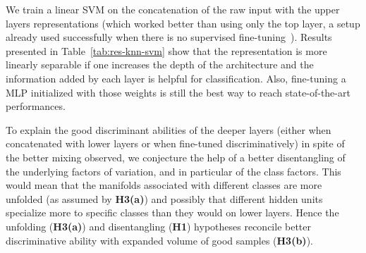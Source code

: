 We train a linear SVM on the concatenation of the raw input with the upper
layers representations (which worked better than using only the top layer,
a setup already used successfully when there is no supervised fine-tuning~\citep{HonglakLNIPS2009-small}).  
Results presented in Table~\ref{tab:res-knn-svm} show
that the representation is more linearly separable if one increases the depth of
the architecture and the information added by each layer is helpful for
classification. Also, fine-tuning a MLP initialized with those weights is still
the best way to reach state-of-the-art performances.  

To explain the good discriminant abilities of the deeper layers (either
when concatenated with lower layers or when fine-tuned discriminatively)
in spite of the better mixing observed, we conjecture the help of a
better disentangling of the underlying factors of variation, and in 
particular of the class factors. This would mean that the manifolds associated 
with different classes are more unfolded (as assumed by {\bf H3(a)}) and possibly
that different hidden units specialize more to specific classes than they
would on lower layers. Hence the unfolding ({\bf H3(a)})
and disentangling ({\bf H1}) hypotheses reconcile better discriminative ability
with expanded volume of good samples ({\bf H3(b)}).

